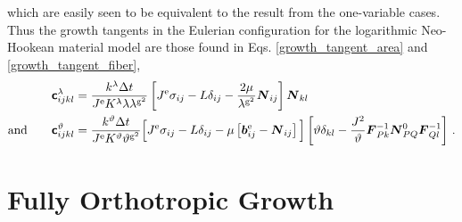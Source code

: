 \documentclass[10pt,letterpaper,oneside]{report}
\newcommand{\ten}[1]{\mbox{\boldmath $#1$}{}}
\newcommand{\tenf}[1]{\mbox{{\sffamily{\bfseries {#1}}}}}
\newcommand{\scas}[1]{\mbox{{\scriptsize{${\rm{#1}}$}}}{}}
\begin{document}
which are easily seen to be equivalent to the result from the one-variable cases.  Thus the growth tangents in the Eulerian configuration for the logarithmic Neo-Hookean material model are those found in Eqs. \ref{growth_tangent_area} and \ref{growth_tangent_fiber}, 
\begin{align*}
\tenf{c}^{\lambda}_{ijkl} 
={}& \frac{k^{\lambda} \Delta t}{J^{\scas{e}} K^\lambda \lambda \lambda^{\scas{g}^2} } 
\left[ J^{\scas{e}} \sigma_{ij} - L \delta_{ij} - \frac{2 \mu}{\lambda^{\scas{g}^2}} \ten{N}_{ij} \right] 
\ten{N}_{kl} 
\\ \mbox{and} \qquad
\tenf{c}^{\vartheta}_{ijkl} 
={}& \frac{k^{\vartheta} \Delta t}{J^{\scas{e}} K^\vartheta \vartheta^{\scas{g}^2} } 
\Big[ J^{\scas{e}} \sigma_{ij} - L \delta_{ij} - \mu \left[ \ten{b}^{\scas{e}}_{ij} - \ten{N}_{ij} \right] \Big] 
\left[ \vartheta \delta_{kl} - \frac{J^2}{\vartheta} \ten{F}^{-1}_{Pk} \ten{N}^0_{PQ} \ten{F}^{-1}_{Ql} \right] \, . 
\end{align*}


\section{Fully Orthotropic Growth}
\end{document}
